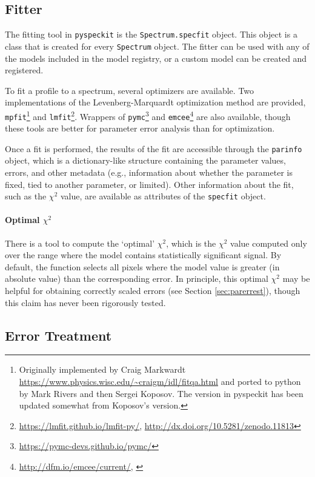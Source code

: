 \documentclass[twocolumn]{aastex61}
\newcommand{\pyspeckit}{\texttt{pyspeckit}\xspace}
\begin{document}
\subsection{Fitter}
\label{sec:fitters}
The fitting tool in \pyspeckit is the \texttt{Spectrum.specfit} object.
This object is a class that is created for every \texttt{Spectrum} object.
The fitter can be used with any of the models included in the model
registry, or a custom model can be created and registered.

To fit a profile to a spectrum, several optimizers are available.  Two
implementations of the Levenberg-Marquardt optimization method
\citep{Levenberg1944a,Marquardt1963a} are provided,
\texttt{mpfit}\footnote{Originally implemented by Craig Markwardt
\url{https://www.physics.wisc.edu/~craigm/idl/fitqa.html} and ported to python
by Mark Rivers and then Sergei Koposov.  The version in pyspeckit has been
updated somewhat from Koposov's version.} and
\texttt{lmfit}\footnote{\url{https://lmfit.github.io/lmfit-py/},
\url{http://dx.doi.org/10.5281/zenodo.11813}}.  Wrappers of
\texttt{pymc}\footnote{\url{https://pymc-devs.github.io/pymc/}} and
\texttt{emcee}\footnote{\url{http://dfm.io/emcee/current/},
\citet{Foreman-Mackey2013a}} are also available, though these tools are better
for parameter error analysis than for optimization.

Once a fit is performed, the results of the fit are accessible through the
\texttt{parinfo} object, which is a dictionary-like structure containing
the parameter values, errors, and other metadata (e.g., information about
whether the parameter is fixed, tied to another parameter, or limited).
Other information about the fit, such as the $\chi^2$ value, are available
as attributes of the \texttt{specfit} object.

\paragraph{Optimal $\chi^2$}
There is a tool to compute the `optimal' $\chi^2$, which is the $\chi^2$
value computed only over the range where the model contains statistically
significant signal.  By default, the function selects all pixels where
the model value is greater (in absolute value) than the corresponding error.
In principle, this optimal $\chi^2$ may be helpful for obtaining correctly
scaled errors (see Section \ref{sec:parerrest}), though this claim has never
been rigorously tested.


\subsection{Error Treatment}
\end{document}
